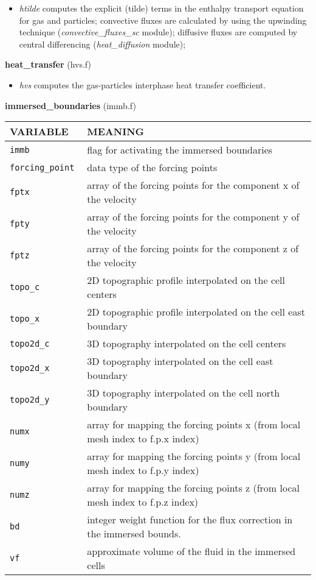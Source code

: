 \begin{itemize}
\item{\em htilde} computes the explicit (tilde) terms in the enthalpy transport equation for gas and particles; 
convective fluxes are calculated by using the upwinding technique ({\em convective\_fluxes\_sc} module); 
diffusive fluxes are computed by central differencing ({\em heat\_diffusion} module);
\end{itemize}
%
%
{\large{\bf heat\_transfer}} (hvs.f) \\
\begin{itemize}
\item{\em hvs} computes the gas-particles interphase heat transfer coefficient.
\end{itemize}
%
%
{\large{\bf immersed\_boundaries}} (immb.f) \\[5mm]
\begin{tabular}{|p{6cm}|p{6cm}|}\hline
VARIABLE & MEANING\\\hline
\tt immb & flag for activating the immersed boundaries \\ \hline
\tt forcing\_point & data type of the forcing points \\ \hline
\tt fptx & array of the forcing points for the component x of the velocity  \\ \hline
\tt fpty & array of the forcing points for the component y of the velocity  \\ \hline
\tt fptz & array of the forcing points for the component z of the velocity  \\ \hline
\tt topo\_c & 2D topographic profile interpolated on the cell centers  \\ \hline
\tt topo\_x & 2D topographic profile interpolated on the cell east boundary  \\ \hline
\tt topo2d\_c & 3D topography interpolated on the cell centers  \\ \hline
\tt topo2d\_x & 3D topography interpolated on the cell east boundary  \\ \hline
\tt topo2d\_y & 3D topography interpolated on the cell north boundary  \\ \hline
\tt numx & array for mapping the forcing points x (from local mesh index to f.p.x index) \\ \hline
\tt numy & array for mapping the forcing points y (from local mesh index to f.p.y index) \\ \hline
\tt numz & array for mapping the forcing points z (from local mesh index to f.p.z index) \\ \hline
\tt bd & integer weight function for the flux correction in the immersed bounds.  \\ \hline
\tt vf & approximate volume of the fluid in the immersed cells \\ \hline
\end{tabular}

